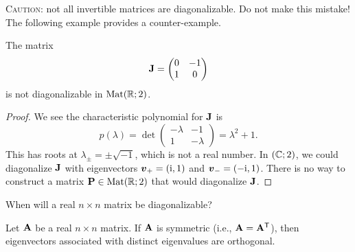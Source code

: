 \begin{ddanger}
\textsc{Caution:} not all invertible matrices are diagonalizable. Do not
make this mistake! The following example provides a counter-example.
\end{ddanger}

\begin{example}
  The matrix
  \begin{equation}
\mathbf{J} = \begin{pmatrix}0 & -1\\1 & 0
\end{pmatrix}
  \end{equation}
  is not diagonalizable in $\mathrm{Mat}(\mathbb{R};2)$.
\end{example}
\begin{proof}
  We see the characteristic polynomial for $\mathbf{J}$ is
  \begin{equation}
p(\lambda) = \det\begin{pmatrix}-\lambda & -1\\1 & -\lambda
\end{pmatrix}=\lambda^{2}+1.
  \end{equation}
  This has roots at $\lambda_{\pm}=\pm\sqrt{-1}$, which is not a real
  number. In $\mathbf{(}\mathbb{C};2)$, we could diagonalize $\mathbf{J}$ with
  eigenvectors $\boldsymbol{v}_{+}=(\mathrm{i},1)$ and $\boldsymbol{v}_{-}=(-\mathrm{i},1)$. There is
  no way to construct a matrix $\mathbf{P}\in\mathrm{Mat}(\mathbb{R};2)$ that would
  diagonalize $\mathbf{J}$.
\end{proof}

 When will a real $n\times n$ matrix be diagonalizable?

\begin{lemma}\label{lemma:linear-transformations:symmetric-matrices-have-orthogonal-eigenvectors-associated-with-different-eigenvalues}
  Let $\mathbf{A}$ be a real $n\times n$ matrix.
  If $\mathbf{A}$ is symmetric (i.e., $\mathbf{A} = \mathbf{A}^{\mathsf{T}}$),
  then eigenvectors associated with distinct eigenvalues are orthogonal.
\end{lemma}

